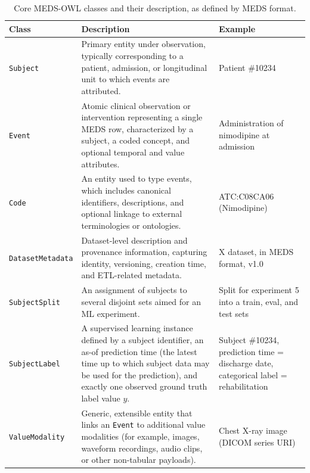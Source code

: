 \begin{table}[htbp]
	\centering
	\caption{Core MEDS-OWL classes and their description, as defined by MEDS format.}
	\label{tab:paper3_meds-owl-concepts}
\begin{tabularx}{\textwidth}{>{\raggedright\arraybackslash}p{} >{\raggedright\arraybackslash}X >{\raggedright\arraybackslash}p{}}
		\toprule
		\textbf{Class} & \textbf{Description} & \textbf{Example} \\
		\midrule
		\texttt{Subject} &
		Primary entity under observation, typically corresponding to a patient, admission, or longitudinal unit to which events are attributed. &
		Patient \#10234 \\
		\texttt{Event} &
		Atomic clinical observation or intervention representing a single MEDS row, characterized by a subject, a coded concept, and optional temporal and value attributes. &
		Administration of nimodipine at admission \\
		\texttt{Code} &
		An entity used to type events, which includes canonical identifiers, descriptions, and optional linkage to external terminologies or ontologies. &
		ATC:C08CA06 (Nimodipine) \\
		\texttt{Dataset\allowbreak Metadata} &
		Dataset-level description and provenance information, capturing identity, versioning, creation time, and ETL-related metadata. &
		X dataset, in MEDS format, v1.0 \\
		\texttt{SubjectSplit} &
		An assignment  of subjects to several disjoint sets aimed for an ML experiment. &
		Split for experiment 5 into a train, eval, and test sets\\
		\texttt{SubjectLabel} &
		A supervised learning instance defined by a subject identifier, an as-of prediction time (the latest time up to which subject data may be used for the prediction), and exactly one observed ground truth label value \(y\). &
		Subject \#10234, prediction time = discharge date, categorical label = rehabilitation\\
		\texttt{ValueModality} & Generic, extensible entity that links an \texttt{Event} to additional value modalities (for example, images, waveform recordings, audio clips, or other non-tabular payloads). & Chest X-ray image (DICOM series URI)\\
		\bottomrule
\end{tabularx}
\end{table}

